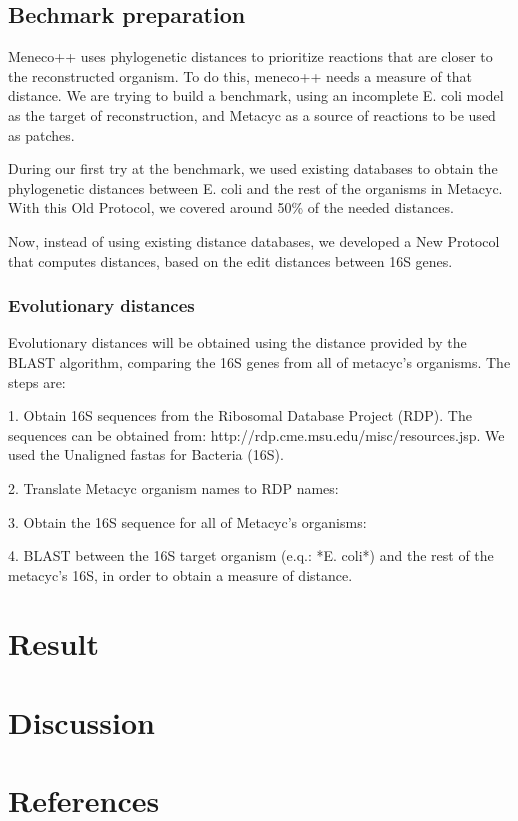 \documentclass{article}
\begin{document}
\subsection{Bechmark preparation}

Meneco++ uses phylogenetic distances to prioritize reactions that are closer to the reconstructed organism. To do this, meneco++ needs a measure of that distance. We are trying to build a benchmark, using an incomplete E. coli model as the target of reconstruction, and Metacyc as a source of reactions to be used as patches.

During our first try at the benchmark, we used existing databases to obtain the phylogenetic distances between E. coli and the rest of the organisms in Metacyc. With this Old Protocol, we covered around 50\% of the needed distances.

Now, instead of using existing distance databases, we developed a New Protocol that computes distances, based on the edit distances between 16S genes.


\subsubsection{Evolutionary distances}

Evolutionary distances will be obtained using the distance provided by the BLAST algorithm, comparing the 16S genes from all of metacyc's organisms. The steps are:

1. Obtain 16S sequences from the Ribosomal Database Project (RDP). The sequences can be obtained from: http://rdp.cme.msu.edu/misc/resources.jsp. We used the Unaligned fastas for Bacteria (16S).

2. Translate Metacyc organism names to RDP names:

3. Obtain the 16S sequence for all of Metacyc's organisms:

4. BLAST between the 16S target organism (e.q.: *E. coli*) and the rest of the metacyc's 16S, in order to obtain a measure of distance.



\section{Result}


\section{Discussion}

\section{References}
\end{document}
